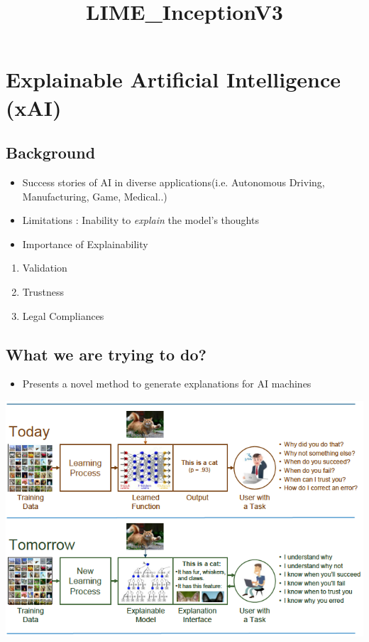 \documentclass[11pt]{article}
\title{LIME\_InceptionV3}
\makeatletter
\def\maxwidth{\ifdim\Gin@nat@width>\linewidth\linewidth
    \else\Gin@nat@width\fi}
\let\Oldincludegraphics\includegraphics
\renewcommand{\includegraphics}[1]{\Oldincludegraphics[width=.8\maxwidth]{#1}}
\providecommand{\tightlist}{%
      \setlength{\itemsep}{0pt}\setlength{\parskip}{0pt}}
\makeatother
\begin{document}
    
    
    \maketitle
    
    

    
    \section{Explainable Artificial Intelligence
(xAI)}\label{explainable-artificial-intelligence-xai}

    \subsection{Background}\label{background}

\begin{itemize}
\tightlist
\item
  Success stories of AI in diverse applications(i.e. Autonomous Driving,
  Manufacturing, Game, Medical..)
\item
  Limitations : Inability to \emph{explain} the model's thoughts
\item
  Importance of Explainability
\end{itemize}

\begin{enumerate}
\def\labelenumi{\arabic{enumi}.}
\tightlist
\item
  Validation
\item
  Trustness
\item
  Legal Compliances
\end{enumerate}

    \subsection{What we are trying to do?}\label{what-we-are-trying-to-do}

\begin{itemize}
\tightlist
\item
  Presents a novel method to generate explanations for AI machines
\end{itemize}

\includegraphics{xAI_Intro.png}
\end{document}
